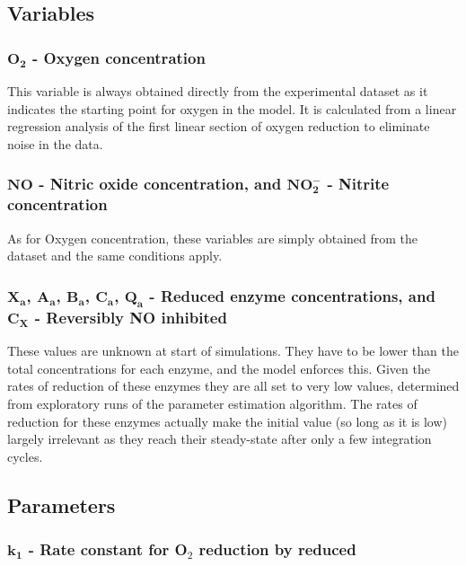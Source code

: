 \subsection*{Variables}
\subsubsection*{$\mathbf{O_2}$ {\bf- Oxygen concentration}}
This variable is always obtained directly from the experimental dataset as it indicates the starting point for oxygen in the model. It is calculated from a linear regression analysis of the first linear section of oxygen reduction to eliminate noise in the data.

\subsubsection*{$\mathbf{NO}$ {\bf- Nitric oxide concentration}, and $\mathbf{NO_2^-}$ {\bf- Nitrite concentration}}
As for Oxygen concentration, these variables are simply obtained from the dataset and the same conditions apply.

\subsubsection*{$\mathbf{X_a}$, $\mathbf{A_a}$, $\mathbf{B_a}$, $\mathbf{C_a}$, $\mathbf{Q_a}$ - Reduced enzyme concentrations, and $\mathbf{C_X}$ {\bf- Reversibly NO inhibited \cbbthree{}}}
These values are unknown at start of simulations. They have to be lower than the total concentrations for each enzyme, and the model enforces this. Given the rates of reduction of these enzymes they are all set to very low values, determined from exploratory runs of the parameter estimation algorithm. The rates of reduction for these enzymes actually make the initial value (so long as it is low) largely irrelevant as they reach their steady-state after only a few integration cycles.

\subsection*{Parameters}
\subsubsection*{$\mathbf{k_1}$ {\bf- Rate constant for O$_{\textrm{2}}$ reduction by reduced \cbbthree{}}}

